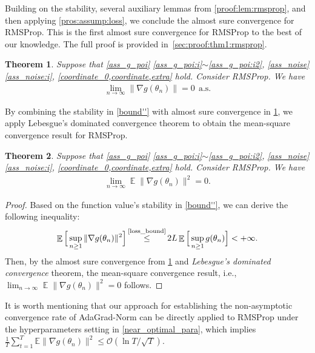 \documentclass[standalone]{article}
\newtheorem{thm}{Theorem}[section]
\DeclareMathOperator{\Expect}{\mathbb{E}}
\begin{document}
Building on the stability,  several auxiliary lemmas from  \cref{proof:lem:rmsprop}, and then applying \cref{pros:assump:loss}, we conclude the almost sure convergence for RMSProp. This is the first almost sure convergence for RMSProp to the best of our knowledge. The full proof is provided in~\cref{sec:proof:thm1:rmsprop}.
\begin{thm}\label{convergence_1.0'}
Suppose that \cref{ass_g_poi} \ref{ass_g_poi:i}$\sim$\ref{ass_g_poi:i2}, \cref{ass_noise} \ref{ass_noise:i}, \cref{coordinate_0,coordinate,extra} hold. Consider RMSProp. We have 
\begin{equation}\nonumber\begin{aligned}
\lim_{n\rightarrow\infty}\|\nabla g(\theta_{n})\|=0\ \ \text{a.s.}
\end{aligned}\end{equation}
\end{thm}
By combining the stability in \cref{bound''} with almost sure convergence in \cref{convergence_1.0'}, we apply Lebesgue’s dominated convergence theorem to obtain the mean-square convergence result for RMSProp. 
\begin{thm}\label{convergence_2.0'}
Suppose that \cref{ass_g_poi} \ref{ass_g_poi:i}$\sim$\ref{ass_g_poi:i2}, \cref{ass_noise} \ref{ass_noise:i}, \cref{coordinate_0,coordinate,extra} hold. Consider RMSProp. We have
\begin{equation}\nonumber\begin{aligned}
\lim_{n\rightarrow\infty}\Expect\|\nabla g(\theta_{n})\|^{2}=0.
\end{aligned}\end{equation}
\end{thm}
\begin{proof}
Based on the function value's stability in \cref{bound''}, we can derive the following inequality:
\[\Expect\Big[\sup_{n\ge 1}\|\nabla g(\theta_{n})\|^{2}\Big] \mathop{\le}^{\text{\cref{loss_bound}}} 2 L\Expect\Big[\sup_{n\ge 1}g(\theta_{n})\Big]<+\infty.\]
Then, by the almost sure convergence  from \cref{convergence_1.0'} and \emph{Lebesgue's dominated convergence} theorem, the mean-square convergence result, i.e., \(\lim_{n\rightarrow\infty}\Expect\|\nabla g(\theta_{n})\|^{2}=0\) follows.  
\end{proof}
It is worth mentioning that our approach for establishing the non-asymptotic convergence rate of AdaGrad-Norm can be directly applied to RMSProp under the hyperparameters setting in \cref{near_optimal_para}, which implies \(\frac{1}{T} \sum_{t=1}^{T} \mathbb{E}\|\nabla g(\theta_{n})\|^2 \leq \mathcal{O}(\ln T/\sqrt{T})\). %
\end{document}

